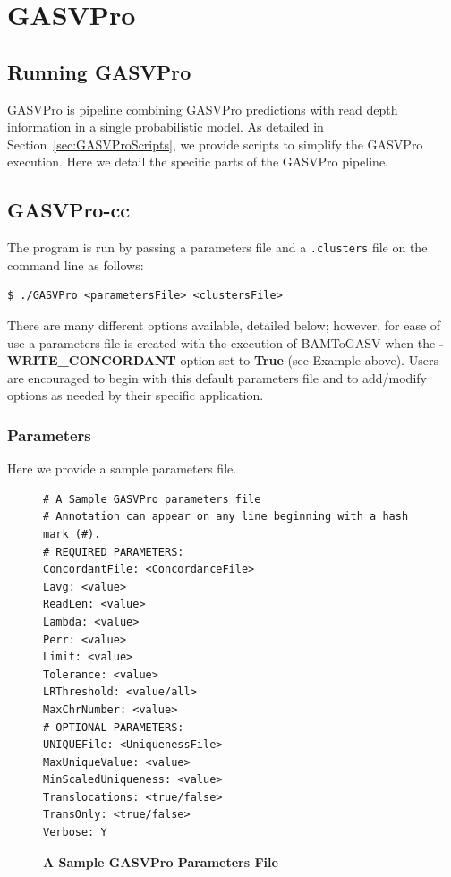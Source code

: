 \documentclass[11pt]{article}
\begin{document}
\section{GASVPro}
\label{gasvprosec}

\subsection{Running GASVPro}

GASVPro is pipeline combining GASVPro predictions with read depth information in a single probabilistic model. As detailed in Section~\ref{sec:GASVProScripts}, we provide scripts to simplify the GASVPro execution. Here we detail the specific parts of the GASVPro pipeline.

\subsection{GASVPro-cc}

The program is run by passing a parameters file and a \verb+.clusters+ file on the command line as follows:
\begin{Verbatim}[frame=single]
$ ./GASVPro <parametersFile> <clustersFile>
\end{Verbatim}
 There are many different options available, detailed below; however, for ease of use a parameters file is created with the execution of BAMToGASV when the {\bf-WRITE\_CONCORDANT} option set to {\bf True} (see Example above). Users are encouraged to begin with this default parameters file and to add/modify options as needed by their specific application.

\subsubsection{Parameters} 

Here we provide a sample parameters file. 
\begin{figure}[H]
\begin{Verbatim}[frame=single]
# A Sample GASVPro parameters file
# Annotation can appear on any line beginning with a hash mark (#).
# REQUIRED PARAMETERS:
ConcordantFile: <ConcordanceFile>
Lavg: <value>
ReadLen: <value>
Lambda: <value>
Perr: <value>
Limit: <value>
Tolerance: <value>
LRThreshold: <value/all>
MaxChrNumber: <value>
# OPTIONAL PARAMETERS: 
UNIQUEFile: <UniquenessFile>
MaxUniqueValue: <value>
MinScaledUniqueness: <value>
Translocations: <true/false>
TransOnly: <true/false>
Verbose: Y
\end{Verbatim}
\caption{\bf A Sample GASVPro Parameters File}
\end{figure}
\end{document}
